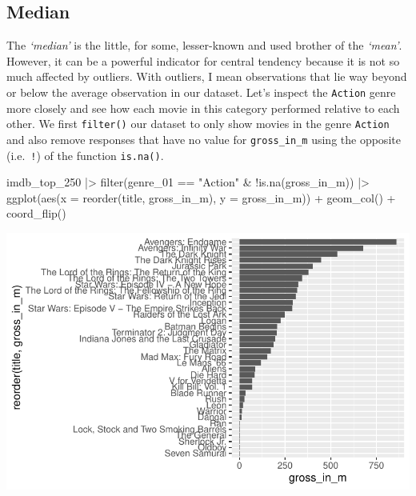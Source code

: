 \documentclass[
  letterpaper,
]{krantz}
\makeatletter
\newenvironment{Shaded}{\begin{snugshade}}{\end{snugshade}}
\newcommand{\AttributeTok}[1]{\textcolor[rgb]{0.40,0.45,0.13}{#1}}
\newcommand{\FunctionTok}[1]{\textcolor[rgb]{0.28,0.35,0.67}{#1}}
\newcommand{\NormalTok}[1]{\textcolor[rgb]{0.00,0.23,0.31}{#1}}
\newcommand{\SpecialCharTok}[1]{\textcolor[rgb]{0.37,0.37,0.37}{#1}}
\newcommand{\StringTok}[1]{\textcolor[rgb]{0.13,0.47,0.30}{#1}}
\newenvironment{kframe}{%
\medskip{}
\setlength{\fboxsep}{.8em}
 \def\at@end@of@kframe{}%
 \ifinner\ifhmode%
  \def\at@end@of@kframe{\end{minipage}}%
  \begin{minipage}{\columnwidth}%
 \fi\fi%
 \def\FrameCommand##1{\hskip\@totalleftmargin \hskip-\fboxsep
 \colorbox{shadecolor}{##1}\hskip-\fboxsep
     \hskip-\linewidth \hskip-\@totalleftmargin \hskip\columnwidth}%
 \MakeFramed {\advance\hsize-\width
   \@totalleftmargin\z@ \linewidth\hsize
   \@setminipage}}%
 {\par\unskip\endMakeFramed%
 \at@end@of@kframe}
\renewenvironment{Shaded}{\begin{kframe}}{\end{kframe}}
\makeatother
\begin{document}
\subsection{Median}\label{median}

The \emph{`median'} is the little, for some, lesser-known and used
brother of the \emph{`mean'}. However, it can be a powerful indicator
for central tendency because it is not so much affected by outliers.
With outliers, I mean observations that lie way beyond or below the
average observation in our dataset. Let's inspect the \texttt{Action}
genre more closely and see how each movie in this category performed
relative to each other. We first \texttt{filter()} our dataset to only
show movies in the genre \texttt{Action} and also remove responses that
have no value for \texttt{gross\_in\_m} using the opposite
(i.e.~\texttt{!}) of the function \texttt{is.na()}.

\begin{Shaded}
\begin{Highlighting}[]
\NormalTok{imdb\_top\_250 }\SpecialCharTok{|\textgreater{}}
  \FunctionTok{filter}\NormalTok{(genre\_01 }\SpecialCharTok{==} \StringTok{"Action"} \SpecialCharTok{\&} \SpecialCharTok{!}\FunctionTok{is.na}\NormalTok{(gross\_in\_m)) }\SpecialCharTok{|\textgreater{}}
  \FunctionTok{ggplot}\NormalTok{(}\FunctionTok{aes}\NormalTok{(}\AttributeTok{x =} \FunctionTok{reorder}\NormalTok{(title, gross\_in\_m),}
             \AttributeTok{y =}\NormalTok{ gross\_in\_m)) }\SpecialCharTok{+}
  \FunctionTok{geom\_col}\NormalTok{() }\SpecialCharTok{+}
  \FunctionTok{coord\_flip}\NormalTok{()}
\end{Highlighting}
\end{Shaded}

\includegraphics{08_descriptive_statistics_files/figure-pdf/earnings-action-movies-barplot-1.pdf}
\end{document}
